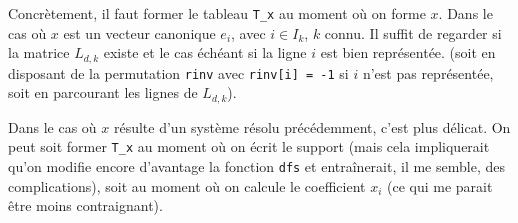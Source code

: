 \documentclass{article}
\begin{document}
Concrètement, il faut former le tableau \verb$T_x$ au moment où on forme $x$. 
Dans le cas où $x$ est un vecteur canonique $e_i$, avec $i \in I_k$, $k$ connu. Il suffit de regarder si la matrice $L_{d,k}$ existe et le cas échéant si la ligne $i$ est bien représentée. (soit en disposant de la permutation \verb$rinv$ avec \verb$rinv[i] = -1$ si $i$ n'est pas représentée, soit en parcourant les lignes de $L_{d,k}$).

Dans le cas où $x$ résulte d'un système résolu précédemment, c'est plus délicat. On peut soit former \verb$T_x$ au moment où on écrit le support (mais cela impliquerait qu'on modifie encore d'avantage la fonction \verb$dfs$ et entraînerait, il me semble, des complications), soit au moment où on calcule le coefficient $x_i$ (ce qui me parait être moins contraignant).
\end{document}
